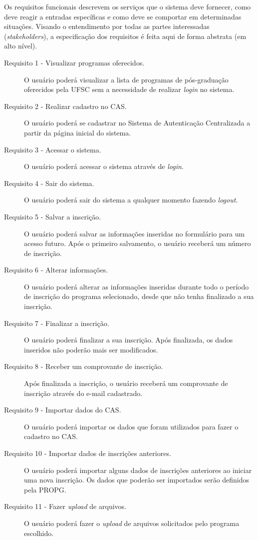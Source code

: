 \documentclass[
  10.5pt,				  %
	openright,			%
	twoside,			  %
  a5paper,
  chapter=TITLE,	%
	section=TITLE,	%
  hyphens,        %
	english,        %
	brazil          %
]{abntex2}
\begin{document}
Os requisitos funcionais descrevem os serviços que o sistema deve fornecer, como deve reagir a entradas específicas e como deve se comportar em determinadas situações. Visando o entendimento por todas as partes interessadas (\emph{stakeholders}), a especificação dos requisitos é feita aqui de forma abstrata (em alto nível).

\begin{description}
\item[Requisito 1 - Visualizar programas oferecidos.] O usuário poderá visualizar a lista de programas de pós-graduação oferecidos pela UFSC sem a necessidade de realizar \emph{login} no sistema.
\item[Requisito 2 - Realizar cadastro no CAS.] O usuário poderá se cadastrar no Sistema de Autenticação Centralizada a partir da página inicial do sistema.
\item[Requisito 3 - Acessar o sistema.] O usuário poderá acessar o sistema através de \emph{login}.
\item[Requisito 4 - Sair do sistema.] O usuário poderá sair do sistema a qualquer momento fazendo \emph{logout}.
\item[Requisito 5 - Salvar a inscrição.] O usuário poderá salvar as informações inseridas no formulário para um acesso futuro. Após o primeiro salvamento, o usuário receberá um número de inscrição.
\item[Requisito 6 - Alterar informações.] O usuário poderá alterar as informações inseridas durante todo o período de inscrição do programa selecionado, desde que não tenha finalizado a sua inscrição.
\item[Requisito 7 - Finalizar a inscrição.] O usuário poderá finalizar a sua inscrição. Após finalizada, os dados inseridos não poderão mais ser modificados.
\item[Requisito 8 - Receber um comprovante de inscrição.] Após finalizada a inscrição, o usuário receberá um comprovante de inscrição através do e-mail cadastrado.
\item[Requisito 9 - Importar dados do CAS.] O usuário poderá importar os dados que foram utilizados para fazer o cadastro no CAS.
\item[Requisito 10 - Importar dados de inscrições anteriores.] O usuário poderá importar alguns dados de inscrições anteriores ao iniciar uma nova inscrição. Os dados que poderão ser importados serão definidos pela PROPG.
\item[Requisito 11 - Fazer \emph{upload} de arquivos.] O usuário poderá fazer o \emph{upload} de arquivos solicitados pelo programa escolhido.

\end{description}
\end{document}
